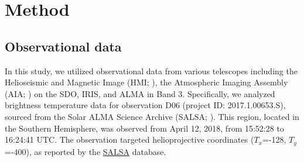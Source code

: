\documentclass[a4paper,alpha-refs]{eSpectra}
\begin{document}

\section{Method}
\subsection{Observational data}

In this study, we utilized observational data from various telescopes including the Helioseismic and Magnetic Image (HMI; \cite{scherrer_helioseismic_2012}), the Atmospheric Imaging Assembly (AIA; \cite{lemen_atmospheric_2012}) on the SDO, IRIS, and ALMA in Band 3. Specifically, we analyzed brightness temperature data for observation D06 (project ID: 2017.1.00653.S), sourced from the Solar ALMA Science Archive  (SALSA; \cite{SALSA_guia}). This region, located in the Southern Hemisphere, was observed from April 12, 2018, from 15:52:28 to 16:24:41 UTC. The observation targeted helioprojective coordinates ($T_x$=-128, $T_y$=-400), as reported by the \href{http://sdc.uio.no/salsa/}{SALSA} database.
\end{document}
